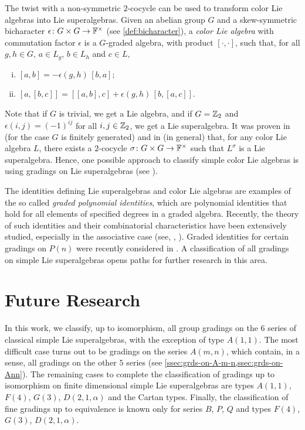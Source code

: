 
The twist with a non-symmetric $2$-cocycle can be used to transform color Lie algebras into Lie superalgebras. 
Given an abelian group $G$ and a skew-symmetric bicharacter $\epsilon\colon G\times G \to \mathbb{F}^\times$ (see \cref{def:bicharacter}), a \emph{color Lie algebra} with commutation factor $\epsilon$ is a $G$-graded algebra, with product $[\cdot, \cdot]$, such that, for all $g, h \in G$, $a \in L_g$, $b \in L_h$ and $c \in L$,
\begin{enumerate}[(i)]
    \item $[a, b] 
    = -\epsilon(g, h)\,[b,a]$;
    \item $[a, [b, c]] 
    = [[a,b],c] + \epsilon(g, h)\,[b,[a,c]]$.
\end{enumerate}
%
Note that if $G$ is trivial, we get a Lie algebra, and if $G = \mathbb{Z}_2$ and $\epsilon(i,j) = (-1)^{ij}$ for all $i,j \in \mathbb{Z}_2$, we get a Lie superalgebra. 
It was proven in \cite{MR529734} (for the case $G$ is finitely generated) and in \cite{MR1600092} (in general) that, for any color Lie algebra $L$, there exists a $2$-cocycle $\sigma\colon G\times G \to \mathbb{F}^\times$ such that $L^\sigma$ is a Lie superalgebra. 
Hence, one possible approach to classify simple color Lie algebras is using gradings on Lie superalgebras (see \cite{MR2497949}).


The identities defining Lie superalgebras and color Lie algebras are examples of the so called \emph{graded polynomial identities}, which are polynomial identities that hold for all elements of specified degrees in a graded algebra. 
Recently, the theory of such identities and their combinatorial characteristics have been extensively studied, especially in the associative case (see, \eg, \cite{MR1935223,MR2176105,MR2680170,MR2639274,MR3068959,MR3030542,MR3152711,MR3271263,MR3773068}). 
Graded identities for certain gradings on $P(n)$ were recently considered in \cite{MR3611462}. 
A classification of all gradings on simple Lie superalgebras opens paths for further research in this area. 


\section{Future Research}

In this work, we classify, up to isomorphism, all group gradings on the $6$ series of classical simple Lie superalgebras, with the exception of type $A(1,1)$. 
The most difficult case turns out to be gradings on the series $A(m,n)$, which contain, in a sense, all gradings on the other $5$ series (see \cref{ssec:grds-on-A-m-n,ssec:grds-on-Ann}). 
The remaining cases to complete the classification of gradings up to isomorphism on finite dimensional simple Lie superalgebras are types $A(1,1)$, $F(4)$, $G(3)$, $D(2,1, \alpha)$ and the Cartan types. 
Finally, the classification of fine gradings up to equivalence is known only for series $B$, $P$, $Q$ and types $F(4)$, $G(3)$, $D(2,1, \alpha)$. 
